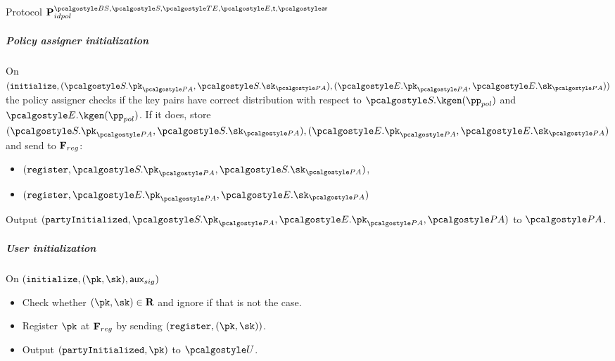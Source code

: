 \documentclass[runningheads,10pt]{llncs}
\numberwithin{equation}{section}
\begin{document}
\begin{protbox}{Protocol $\prot{idpol}^{\BSIG, \SIG, \TENC, \ENC, \thresholdar, \noofar}$}
  \subparagraph{Policy assigner initialization} On
  $(\initialize, (\SIG.\pk_{\polas}, \SIG.\sk_{\polas}), (\ENC.\pk_{\polas},
  \ENC.\sk_{\polas}))$ the policy assigner checks if the key pairs have correct
  distribution with respect to $\SIG.\kgen(\pp_{pol})$ and $\ENC.\kgen
  (\pp_{pol})$. If it does, store
  $(\SIG.\pk_{\polas}, \SIG.\sk_{\polas}), (\ENC.\pk_{\polas}, \ENC.\sk_{\polas})$
  and send to $\mathbf{F}_{{reg}}$:
  \begin{itemize}
  \item $(\register, \SIG.\pk_{\polas}, \SIG.\sk_{\polas})$,
  \item $(\register, \ENC.\pk_{\polas}, \ENC.\sk_{\polas})$
  \end{itemize}
  Output $(\partyInitialized, \SIG.\pk_{\polas}, \ENC.\pk_{\polas}, \polas)$ to $\polas$.

  \subparagraph{User initialization} On
   $(\initialize, (\pk, \sk), \aux_{sig})$
  \begin{itemize}
  \item Check whether $(\pk, \sk) \in \REL$ and ignore if that is not the case.
  \item Register $\pk$ at $\mathbf{F}_{{reg}}$ by sending $(\register, (\pk, \sk))$.
  \item Output $(\partyInitialized, \pk)$ to $\user$.
  \end{itemize}


\end{protbox}
\end{document}
